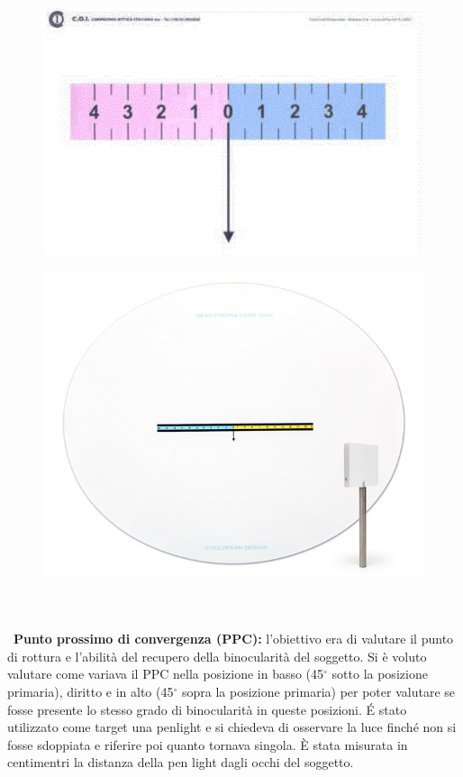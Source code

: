 \begin{figure}[h!]
\centering
\begin{minipage}{.5\textwidth}
  \centering
  \includegraphics[scale=0.15]{source/immagini/foria_lontano.png}
  \label{fig:test1}
\end{minipage}%
\begin{minipage}{.5\textwidth}
  \centering
  \includegraphics[scale=0.41]{source/immagini/foria_vicino.jpg}
  \label{fig:test2}
\end{minipage}
\end{figure}
\\\ \\\
\textbf{Punto prossimo di convergenza (PPC):} l’obiettivo era di valutare il punto di rottura e l’abilità del recupero della binocularità del soggetto. Si è voluto valutare come variava il PPC nella posizione in basso (45$^{\circ}$ sotto la posizione primaria), diritto e in alto (45$^{\circ}$ sopra la posizione primaria) per poter valutare se fosse presente lo stesso grado di binocularità in queste posizioni. É stato utilizzato come target una penlight e si chiedeva di osservare la luce finché non si fosse sdoppiata e riferire poi quanto tornava singola. È stata misurata in centimentri la distanza della pen light dagli occhi del soggetto. 
